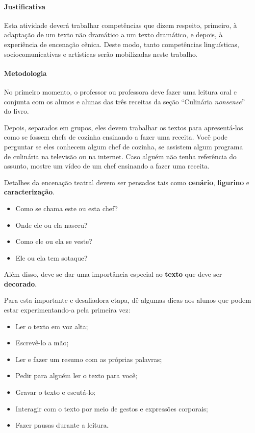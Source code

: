 \documentclass[11pt]{extarticle}
\begin{document}
\paragraph{Justificativa} Esta atividade deverá trabalhar competências que dizem respeito, primeiro,
à adaptação de um texto não dramático a um texto dramático, e depois, à experiência de encenação cênica. 
Deste modo, tanto competências linguísticas, sociocomunicativas e artísticas serão mobilizadas neste trabalho. 

\paragraph{Metodologia} No primeiro momento, o professor ou professora deve fazer uma leitura oral
e conjunta com os alunos e alunas das três receitas da seção ``Culinária \emph{nonsense}'' do livro. 

Depois, separados em grupos, eles devem trabalhar os textos para apresentá-los 
como se fossem chefs de cozinha ensinando a fazer uma receita. 
Você pode perguntar se eles conhecem algum chef de cozinha, 
se assistem algum programa de culinária na televisão ou na internet. 
Caso alguém não tenha referência do assunto, mostre um vídeo 
de um chef ensinando a fazer uma receita. 

Detalhes da encenação teatral devem ser pensados tais como \textbf{cenário},
\textbf{figurino} e \textbf{caracterização}. 

\begin{itemize}
	\item Como se chama este ou esta chef?
	\item Onde ele ou ela nasceu?
	\item Como ele ou ela se veste?
	\item Ele ou ela tem sotaque? 
\end{itemize}

Além disso, deve se dar uma importância especial ao \textbf{texto} que deve
ser \textbf{decorado}. 

Para esta importante e desafiadora etapa, dê algumas dicas aos alunos
que podem estar experimentando-a pela primeira vez:

\begin{itemize}
	\item Ler o texto em voz alta;
	\item Escrevê-lo a mão;
	\item Ler e fazer um resumo com as próprias palavras;
	\item Pedir para alguém ler o texto para você;
	\item Gravar o texto e escutá-lo;
	\item Interagir com o texto por meio de gestos e expressões corporais;
	\item Fazer pausas durante a leitura.
\end{itemize}
\end{document}
